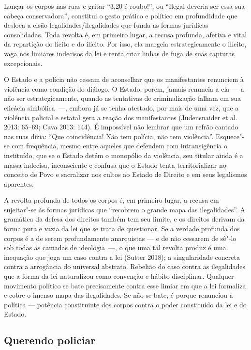 Lançar os corpos nas ruas e gritar ``3,20 é roubo!'', ou ``Ilegal
deveria ser essa sua cabeça conservadora'', constitui o gesto prático e
político em profundidade que desloca a cisão legalidades/ilegalidades
que funda as formas jurídicas consolidadas. Toda revolta é, em primeiro
lugar, a recusa profunda, afetiva e vital da repartição do lícito e do
ilícito. Por isso, ela margeia estrategicamente o ilícito, vaga nos
limiares indecisos da lei e tenta criar linhas de fuga de suas capturas
excepcionais.

O Estado e a polícia não cessam de aconselhar que os manifestantes
renunciem à violência como condição do diálogo. O Estado, porém, jamais
renuncia a ela --- a não ser estrategicamente, quando as tentativas de
criminalização falham em sua eficácia simbólica~---, embora já se tenha
atestado, por mais de uma vez, que a violência policial e estatal gera a
reação dos manifestantes (Judensnaider et al. 2013: 65--69; Cava 2013:
144). É impossível não lembrar que um refrão cantado nas ruas dizia:
``Que coincidência! Não tem polícia, não tem violência''. Esquece"-se com
frequência, mesmo entre aqueles que defendem com intransigência o
instituído, que se o Estado detém o monopólio da violência, seu titular
ainda é a massa indecisa, inconsciente e confusa que o Estado tenta
territorializar no conceito de Povo e sacralizar nos cultos ao Estado de
Direito e em seus legalismos aparentes.

A revolta profunda de todos os corpos é, em primeiro lugar, a recusa em
sujeitar"-se às formas jurídicas que ``recobrem o grande mapa das
ilegalidades''. A gramática da defesa dos direitos também tem seu
limite, e os direitos derivam da forma pura e vazia da lei que se trata
de questionar. Se a verdade profunda dos corpos é a de serem
profundamente anarquistas --- e de não cessarem de sê"-lo sob todas as
camadas de ideologia~---, o que uma tal revolta produz é uma inequação
que joga um caso contra a lei (Sutter 2018); a singularidade concreta
contra a arrogância do universal abstrato. Rebelião do caso contra as
ilegalidades que a forma da lei naturalizou como convenção e hábito
disciplinar. Qualquer movimento político se bate precisamente contra
esse limiar em que a lei formaliza e cobre o imenso mapa das
ilegalidades. Se não se bate, é porque renunciou à política --- potência
constituinte dos corpos contra o poder constituído da lei e do Estado.

\subsection{Querendo policiar}

